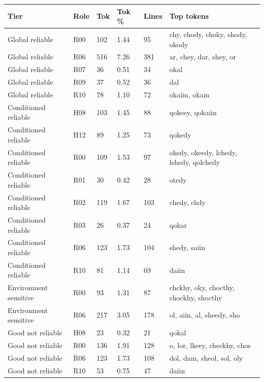 \begin{tabular}{llllll}
\toprule
Tier & Role & Tok & Tok \% & Lines & Top tokens \\
\midrule
Global reliable & R00 & 102 & 1.44 & 95 & chy, chody, choky, shody, okody \\
Global reliable & R06 & 516 & 7.26 & 381 & ar, chey, dar, shey, or \\
Global reliable & R07 & 36 & 0.51 & 34 & okal \\
Global reliable & R09 & 37 & 0.52 & 36 & dal \\
Global reliable & R10 & 78 & 1.10 & 72 & okaiin, okain \\
Conditioned reliable & H08 & 103 & 1.45 & 88 & qokeey, qokaiin \\
Conditioned reliable & H12 & 89 & 1.25 & 73 & qokedy \\
Conditioned reliable & R00 & 109 & 1.53 & 97 & okedy, okeedy, lchedy, lshedy, qolchedy \\
Conditioned reliable & R01 & 30 & 0.42 & 28 & otedy \\
Conditioned reliable & R02 & 119 & 1.67 & 103 & chedy, chdy \\
Conditioned reliable & R03 & 26 & 0.37 & 24 & qokar \\
Conditioned reliable & R06 & 123 & 1.73 & 104 & shedy, saiin \\
Conditioned reliable & R10 & 81 & 1.14 & 69 & daiin \\
Environment sensitive & R00 & 93 & 1.31 & 87 & chckhy, oky, chocthy, chockhy, shocthy \\
Environment sensitive & R06 & 217 & 3.05 & 178 & ol, aiin, al, sheedy, sho \\
Good not reliable & H08 & 23 & 0.32 & 21 & qokal \\
Good not reliable & R00 & 136 & 1.91 & 128 & o, lor, lkeey, checkhy, chos \\
Good not reliable & R06 & 123 & 1.73 & 108 & dol, dam, sheol, sol, oly \\
Good not reliable & R10 & 53 & 0.75 & 47 & daiin \\
\bottomrule
\end{tabular}
